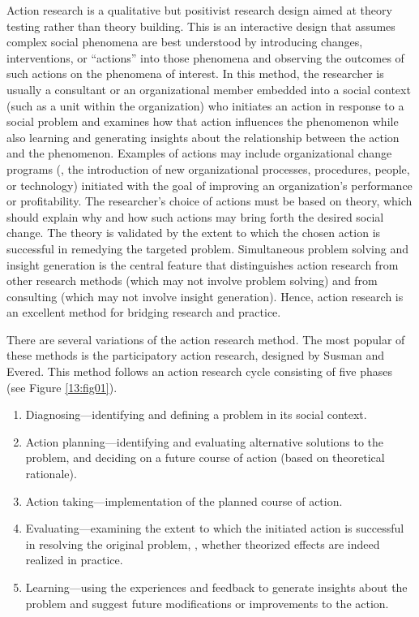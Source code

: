 Action research is a qualitative but positivist research design aimed at theory testing rather than theory building. This is an interactive design that assumes complex social phenomena are best understood by introducing changes, interventions, or ``actions'' into those phenomena and observing the outcomes of such actions on the phenomena of interest. In this method, the researcher is usually a consultant or an organizational member embedded into a social context (such as a unit within the organization) who initiates an action in response to a social problem and examines how that action influences the phenomenon while also learning and generating insights about the relationship between the action and the phenomenon. Examples of actions may include organizational change programs (\eg, the introduction of new organizational processes, procedures, people, or technology) initiated with the goal of improving an organization's performance or profitability. The researcher's choice of actions must be based on theory, which should explain why and how such actions may bring forth the desired social change. The theory is validated by the extent to which the chosen action is successful in remedying the targeted problem. Simultaneous problem solving and insight generation is the central feature that distinguishes action research from other research methods (which may not involve problem solving) and from consulting (which may not involve insight generation). Hence, action research is an excellent method for bridging research and practice.

There are several variations of the action research method. The most popular of these methods is the participatory action research, designed by Susman and Evered\cite{evered1978assessment}. This method follows an action research cycle consisting of five phases (see Figure \ref{13:fig01}). 

\begin{enumerate}
	\item Diagnosing---identifying and defining a problem in its social context. 
	\item Action planning---identifying and evaluating alternative solutions to the problem, and deciding on a future course of action (based on theoretical rationale). 
	\item Action taking---implementation of the planned course of action. 
	\item Evaluating---examining the extent to which the initiated action is successful in resolving the original problem, \ie, whether theorized effects are indeed realized in practice. 
	\item Learning---using the experiences and feedback to generate insights about the problem and suggest future modifications or improvements to the action. 
\end{enumerate}

